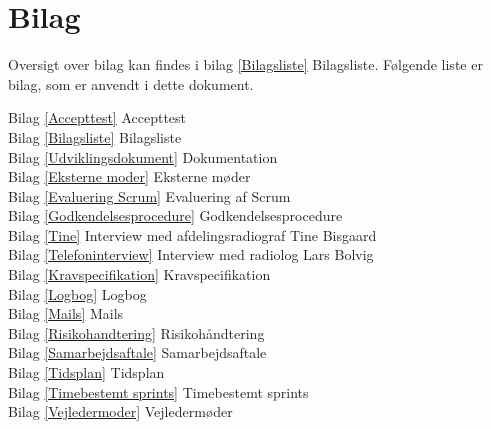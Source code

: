 \chapter{Bilag}\label{kapBilag}
Oversigt over bilag kan findes i bilag \ref{Bilagsliste} Bilagsliste. Følgende liste er bilag, som er anvendt i dette dokument. 

Bilag \ref{Accepttest} Accepttest \\
Bilag \ref{Bilagsliste} Bilagsliste\\
Bilag \ref{Udviklingsdokument} Dokumentation\\
Bilag \ref{Eksterne moder} Eksterne møder \\
Bilag \ref{Evaluering Scrum} Evaluering af Scrum\\
Bilag \ref{Godkendelsesprocedure} Godkendelsesprocedure\\
Bilag \ref{Tine} Interview med afdelingsradiograf Tine Bisgaard\\
Bilag \ref{Telefoninterview} Interview med radiolog Lars Bolvig \\
Bilag \ref{Kravspecifikation} Kravspecifikation\\
Bilag \ref{Logbog} Logbog\\
Bilag \ref{Mails} Mails \\
Bilag \ref{Risikohandtering} Risikohåndtering \\
Bilag \ref{Samarbejdsaftale} Samarbejdsaftale \\
Bilag \ref{Tidsplan} Tidsplan \\
Bilag \ref{Timebestemt sprints} Timebestemt sprints\\
Bilag \ref{Vejledermoder} Vejledermøder



